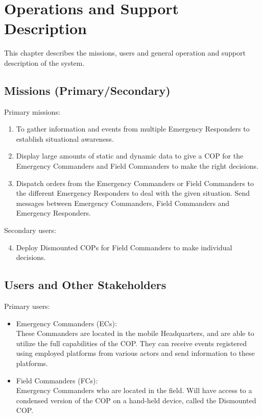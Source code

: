 \chapter{Operations and Support Description}
\label{chp_operations}
This chapter describes the missions, users and general operation and support description of the system.

\section{Missions (Primary/Secondary)}
Primary missions:
\begin{enumerate}
	\item To gather information and events from multiple Emergency Responders to establish situational awareness.
	\item Display large amounts of static and dynamic data to give a COP for the Emergency Commanders and Field Commanders to make the right decisions.
	\item Dispatch orders from the Emergency Commanders or Field Commanders to the different Emergency Responders to deal with the given situation. Send messages between Emergency Commanders, Field Commanders and Emergency Responders.
\end{enumerate}

\noindent Secondary users:
\begin{enumerate}
	\setcounter{enumi}{3}
	\item Deploy Dismounted COPs for Field Commanders to make individual decisions.
\end{enumerate}

\section{Users and Other Stakeholders}
\noindent Primary users:
\begin{itemize}
	\item Emergency Commanders (ECs): \\
	These Commanders are located in the mobile Headquarters, and are able to utilize the full capabilities of the COP. They can receive events registered using employed platforms from various actors and send information to these platforms.
	\item Field Commanders (FCs):\\
	Emergency Commanders who are located in the field. Will have access to a condensed version of the COP on a hand-held device, called the Dismounted COP.
\end{itemize}
	
